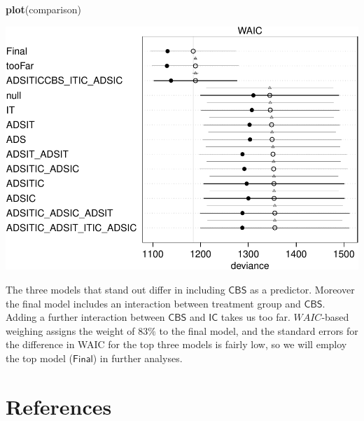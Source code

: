\documentclass[10pt,dvipsnames,enabledeprecatedfontcommands]{scrartcl}
\newenvironment{Shaded}{\begin{snugshade}}{\end{snugshade}}
\newcommand{\KeywordTok}[1]{\textcolor[rgb]{0.13,0.29,0.53}{\textbf{#1}}}
\newcommand{\NormalTok}[1]{#1}
\begin{document}
\begin{Shaded}
\begin{Highlighting}[]
\KeywordTok{plot}\NormalTok{(comparison)}
\end{Highlighting}
\end{Shaded}

\begin{center}\includegraphics[width=1\linewidth]{bayesianReport_files/figure-latex/unnamed-chunk-11-1} \end{center}
\normalsize

The three models that stand out differ in including \(\mathsf{CBS}\) as
a predictor. Moreover the final model includes an interaction between
treatment group and \(\mathsf{CBS}\). Adding a further interaction
between \(\mathsf{CBS}\) and \(\mathsf{IC}\) takes us too far.
\(WAIC\)-based weighing assigns the weight of \(83\%\) to the final
model, and the standard errors for the difference in WAIC for the top
three models is fairly low, so we will employ the top model
(\(\mathsf{Final}\)) in further analyses.

\hypertarget{references}{%
\section*{References}\label{references}}

\vspace{-3mm}
\end{document}
